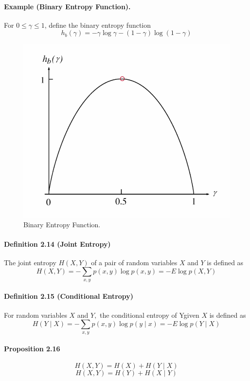 \documentclass[8pt]{article}
\begin{document}
\begin{tcolorbox}
\paragraph{Example (Binary Entropy Function).}
For $0 \leq \gamma \leq 1$, define the binary entropy function
$$
h_{b}(\gamma)=-\gamma \log \gamma-(1-\gamma) \log (1-\gamma)
$$
\end{tcolorbox}

\begin{figure}[!h]
    \centering
    \includegraphics[width=0.3\linewidth]{imgs/exp2_13.png}
    \caption{Binary Entropy Function.}
    \label{fig:my_label}
\end{figure}

\begin{tcolorbox}
\paragraph{Definition 2.14 (Joint Entropy)} The joint entropy $H(X, Y)$ of a pair of random variables $X$ and $Y$ is defined as
$$
H(X, Y)=-\sum_{x, y} p(x, y) \log p(x, y)=-E \log p(X, Y)
$$
\paragraph{Definition 2.15 (Conditional Entropy)} For random variables $X$ and $Y,$ the conditional entropy of Ygiven $X$ is defined as
$$
H(Y \mid X)=-\sum_{x, y} p(x, y) \log p(y \mid x)=-E \log p(Y \mid X)
$$

\paragraph{Proposition 2.16}
$$
H(X, Y)=H(X)+H(Y \mid X)
$$
$$
H(X, Y)=H(Y)+H(X \mid Y)
$$
\end{tcolorbox}
\end{document}
